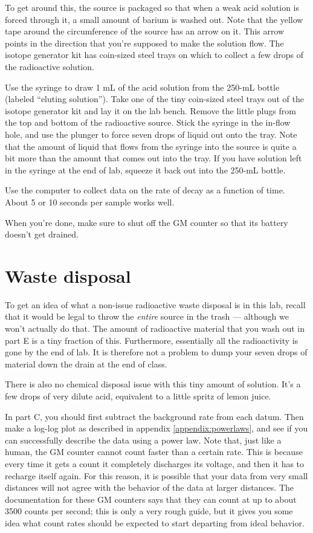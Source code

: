 
To get around this, the source is packaged so that when a weak acid solution is forced through
it, a small amount of barium is washed out. Note that the yellow tape around the circumference
of the source has an arrow on it. This arrow points in the direction that you're supposed
to make the solution flow. The isotope generator kit has coin-sized steel trays on which to
collect a few drops of the radioactive solution.

Use the syringe to draw 1 mL of the acid solution from the 250-mL bottle (labeled ``eluting solution'').
Take one of the tiny coin-sized steel trays out of the isotope generator kit and lay it on the lab bench.
Remove the little plugs from the top and bottom of the radioactive source. Stick the syringe in the
in-flow hole, and use the plunger to force seven drops of liquid out onto the tray. Note that
the amount of liquid that flows from the syringe into the source is quite a bit more than the
amount that comes out into the tray. If you have solution left in the syringe at the end of lab,
squeeze it back out into the 250-mL bottle.

Use the computer to collect data on the rate of decay as a function of time. About 5 or 10 seconds
per sample works well.

When you're done, make sure to shut off the GM counter so that its battery doesn't get drained.

\section*{Waste disposal}

To get an idea of what a non-issue  radioactive waste disposal is in this lab,
recall that it would be legal to throw the \emph{entire} source in the trash --- although we won't
actually do that.
The amount of radioactive material that you wash out in part E is a tiny fraction of this.
Furthermore, essentially all the radioactivity is
gone by the end of lab. It is therefore not a problem to dump your seven drops of material
down the drain at the end of class.

There is also no chemical disposal issue with this tiny amount of solution.
It's a few drops of very dilute acid, equivalent to a little spritz of lemon juice.

\analysis

In part C, you should first subtract the background
rate from each datum. Then make a log-log plot as described in appendix \ref{appendix:powerlaws},
and see if you can successfully describe the data using a power law.
Note that, just like a human, the GM counter cannot count faster than a certain rate.
This is because every time it gets a count it completely discharges its voltage, and
then it has to recharge itself again. For this reason, it is possible that your data
from very small distances will not agree with the behavior of the data at larger distances.
The documentation for these GM counters says that they can count at up to about
3500 counts per second; this is only a very rough guide, but it gives you some idea what
count rates should be expected to start departing from ideal behavior.

